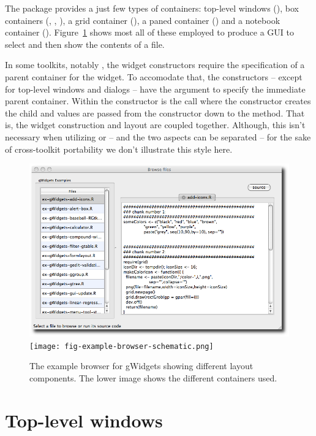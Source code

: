 The  package provides a just few types of containers:
top-level windows (), box containers (,
, ), a grid container
(), a paned container () and a
notebook container
(). Figure~\ref{fig:gWidgets-sample-layout} shows most
all of these employed to produce a GUI to select and then show the
contents of a file.


In some toolkits, notably , the widget constructors require
the specification of a parent container for the widget. To accomodate
that, the  constructors -- except for top-level windows
and dialogs -- have the argument  to specify the
immediate parent container.  Within the constructor is the call
 where the constructor creates the
child and   values are passed from the constructor down to
the  method.  That is, the widget construction and layout
are coupled together. Although, this isn't necessary when utilizing
 or  -- and the two aspects can be separated --
for the sake of cross-toolkit portability we don't illustrate this
style here.



\begin{figure}
  \centering
  \includegraphics[width=.8\textwidth]{fig-gWidgets-example-browser}
  \texttt{[image: fig-example-browser-schematic.png]}
  \caption{The example browser for gWidgets showing different layout
    components. The lower image shows the different containers used.}
  \label{fig:gWidgets-sample-layout}
\end{figure}



\section{Top-level windows}
\label{sec:gWidgets-top-level-windows}

